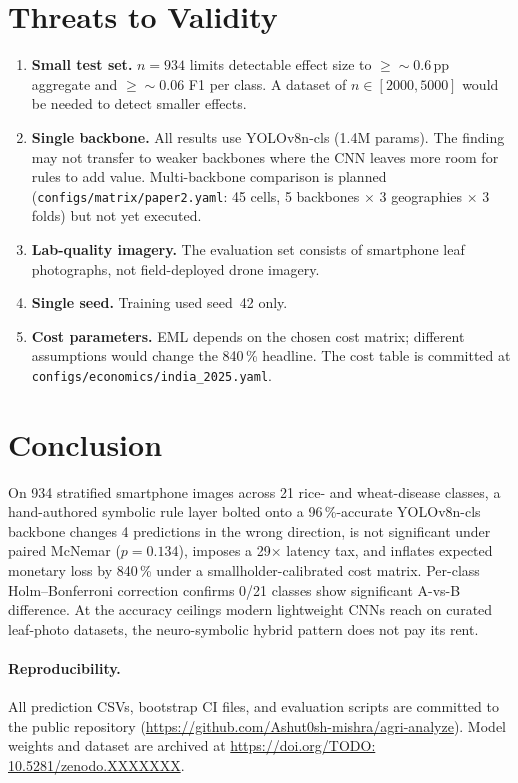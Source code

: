 \documentclass[runningheads]{llncs}
\newcommand{\codeurl}{https://github.com/Ashut0sh-mishra/agri-analyze}
\newcommand{\zenododoi}{TODO: 10.5281/zenodo.XXXXXXX}   %
\begin{document}
\section{Threats to Validity}

\begin{enumerate}
  \item \textbf{Small test set.} $n=934$ limits detectable effect size to
        $\geq\!\sim$0.6\,pp aggregate and $\geq\!\sim$0.06 F1 per class.
        A dataset of $n\in[2000,5000]$ would be needed to detect smaller effects.

  \item \textbf{Single backbone.} All results use YOLOv8n-cls (1.4M params).
        The finding may not transfer to weaker backbones where the CNN leaves
        more room for rules to add value. Multi-backbone comparison is planned
        (\texttt{configs/matrix/paper2.yaml}: 45 cells, 5 backbones $\times$
        3 geographies $\times$ 3 folds) but not yet executed.

  \item \textbf{Lab-quality imagery.} The evaluation set consists of
        smartphone leaf photographs, not field-deployed drone imagery.

  \item \textbf{Single seed.} Training used seed~42 only.

  \item \textbf{Cost parameters.} EML depends on the chosen cost matrix;
        different assumptions would change the 840\,\% headline. The cost
        table is committed at \texttt{configs/economics/india\_2025.yaml}.
\end{enumerate}

\section{Conclusion}

On 934 stratified smartphone images across 21 rice- and wheat-disease
classes, a hand-authored symbolic rule layer bolted onto a 96\,\%-accurate
YOLOv8n-cls backbone changes 4 predictions in the wrong direction, is not
significant under paired McNemar ($p=0.134$), imposes a 29$\times$ latency
tax, and inflates expected monetary loss by 840\,\% under a
smallholder-calibrated cost matrix. Per-class Holm--Bonferroni correction
confirms 0/21 classes show significant A-vs-B difference. At the accuracy
ceilings modern lightweight CNNs reach on curated leaf-photo datasets, the
neuro-symbolic hybrid pattern does not pay its rent.

\paragraph{Reproducibility.}
All prediction CSVs, bootstrap CI files, and evaluation scripts are committed
to the public repository (\url{\codeurl}). Model weights and dataset are
archived at \url{https://doi.org/\zenododoi}.



\end{document}
